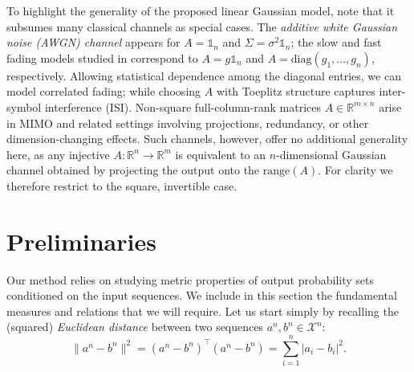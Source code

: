 \documentclass[10pt,conference]{IEEEtran}
\newcommand{\1}{\mathds{1}}
\newcommand{\cX}{\mathcal{X}}
\begin{document}
To highlight the generality of the proposed linear Gaussian model, note that it subsumes many classical channels as special cases. The \emph{additive white Gaussian noise (AWGN) channel} appears for $A=\1_n$ and $\Sigma=\sigma^2\1_n$; the slow and fast fading models studied in \cite{DI-fading} correspond to $A=g\1_n$ and $A=\mathrm{diag}(g_1,\ldots,g_n)$, respectively. Allowing statistical dependence among the diagonal entries, we can model correlated fading; while choosing $A$ with Toeplitz structure captures inter-symbol interference (ISI). 
Non-square full-column-rank matrices $A \in \mathbb{R}^{m \times n}$ arise in MIMO and related settings involving projections, redundancy, or other dimension-changing effects. Such channels, however, offer no additional generality here, as any injective $A : \mathbb{R}^n \to \mathbb{R}^m$ is equivalent to an $n$-dimensional Gaussian channel obtained by projecting the output onto the $\mathrm{range}(A)$. For clarity we therefore restrict to the square, invertible case.



\medskip

\section{Preliminaries}
\label{sec:preliminaries}
Our method relies on studying metric properties of output probability sets conditioned on the input sequences. We include in this section the fundamental measures and relations that we will require.
Let us start simply by recalling the (squared) \emph{Euclidean distance} between two sequences $a^n,b^n\in\cX^n$:
\begin{equation}
    \|a^n-b^n\|^2 
      = {(a^n - b^n)^\top  (a^n - b^n)}
      = {\sum_{i=1}^n|a_i-b_i|^2}.
\end{equation}
\end{document}
